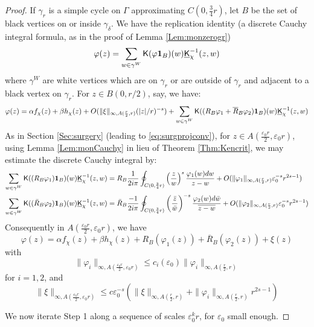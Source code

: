 \documentclass[10pt]{article}
\newcommand{\eps}{\varepsilon}
\newcommand{\ind}{{\bf 1}}
\newcommand{\rK}{{\sf K}}
\newcommand{\uK}{{\underline {\sf K}}}
\begin{document}
\begin{proof}
If $\gamma_r$ is a simple cycle on $\Gamma$ approximating $C(0,\frac 34r)$, let $B$ be the set of black vertices on or inside $\gamma_\delta$. We have the replication identity (a discrete Cauchy integral formula, as in the proof of Lemma \ref{Lem:monzerogr})
$$\varphi(z)=\sum_{w\in\gamma^W}\rK(\varphi\ind_B)(w)\uK_\chi^{-1}(z,w)$$
where $\gamma^W$ are white vertices which are on $\gamma_r$ or are outside of $\gamma_r$ and adjacent to a black vertex on $\gamma_r$. For $z\in B(0,r/2)$, say, we have:
$$\varphi(z)=\alpha f_\chi(z)+\beta h_\chi(z)+O(\|\xi\|_{\infty,A(\frac r2,r)}(|z|/r)^{-s})+\sum_{w\in\gamma^W}\rK((R_B\varphi_1+{\overline R_B}\varphi_2)\ind_B)(w)\uK_\chi^{-1}(z,w)$$
As in Section \ref{Sec:surgery} (leading to \eqref{eq:surgprojconv}), for $z\in A(\frac{\eps_0r}2,\eps_0r)$, using Lemma \ref{Lem:monCauchy} in lieu of Theorem \ref{Thm:Kencrit}, we may estimate the discrete Cauchy integral by:
\begin{align*}
\sum_{w\in\gamma^W}\rK((R_B\varphi_1)\ind_B)(w)\uK_\chi^{-1}(z,w)
&=R_B\frac{1}{2i\pi}\oint_{C(0,\frac 34r)}\left(\frac zw\right)^s\frac{\varphi_1(w)dw}{z-w}+O(\|\varphi_1\|_{\infty,A(\frac r2,r)}\eps_0^{-s}r^{2s-1})\\
\sum_{w\in\gamma^W}\rK((\bar R_B\varphi_2)\ind_B)(w)\uK_\chi^{-1}(z,w)
&=\bar R_B\frac{-1}{2i\pi}\oint_{C(0,\frac 34r)}\left(\frac {\bar z}{\bar w}\right)^{-s}\frac{\varphi_2(w)d\bar w}{\overline{z-w}}+O(\|\varphi_2\|_{\infty,A(\frac r2,r)}\eps_0^{-s}r^{2s-1})
\end{align*}
Consequently in $A(\frac{\eps_0r}2,\eps_0r)$, we have
$$\varphi(z)=\alpha f_\chi(z)+\beta h_\chi(z)+R_B(\varphi_1(z))+{\overline R_B}(\varphi_2(z))+\xi(z)$$
with
$$\|\varphi_i\|_{\infty,A(\frac{\eps_0r}2,\eps_0r)}\leq c_i(\eps_0)\|\varphi_i\|_{\infty,A(\frac{r}2,r)}$$
for $i=1,2$, and
$$\|\xi\|_{\infty,A(\frac{\eps_0r}2,\eps_0r)}\leq c\eps_0^{-s}\left(\|\xi\|_{\infty,A(\frac{r}2,r)}+\|\varphi_i\|_{\infty,A(\frac r2,r)}r^{2s-1}\right)$$

 We now iterate Step 1 along a sequence of scales $\eps_0^kr$, for $\eps_0$ small enough.


\end{proof}
\end{document}
